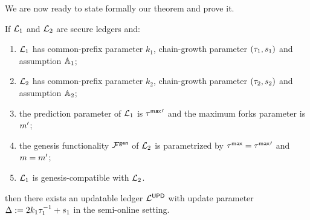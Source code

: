 We are now ready to state formally our theorem and prove it.

\begin{theorem}
If $\mathcal{L}_1$ and $\mathcal{L}_2$ are secure ledgers and:
\begin{enumerate}
	\item $\mathcal{L}_1$  has common-prefix parameter $k_1$, chain-growth parameter  $(\tau_1, s_1)$ and
	assumption $\mathbb{A}_1$;
	\item $\mathcal{L}_2$  has common-prefix parameter $k_2$, chain-growth parameter  $(\tau_2, s_2)$ and
	assumption $\mathbb{A}_2$;
	\item the prediction parameter of $\mathcal{L}_1$ is ${\tau^\mathsf{max}}'$ and the maximum forks parameter is ${m}'$;
	\item the genesis functionality $\mathcal{F}^\mathsf{gen}$ of $\mathcal{L}_2$ is parametrized by $\tau^\mathsf{max}={\tau^\mathsf{max}}'$ and 
	$m={m}'$;
	\item $\mathcal{L}_1$ is genesis-compatible with $\mathcal{L}_2$.
\end{enumerate}

then there exists an updatable ledger $\mathcal{L}^\mathsf{UPD}$ with update parameter $\Delta:=2k_1 \tau_1^{-1}+s_1$ in the
semi-online setting.

\end{theorem}





